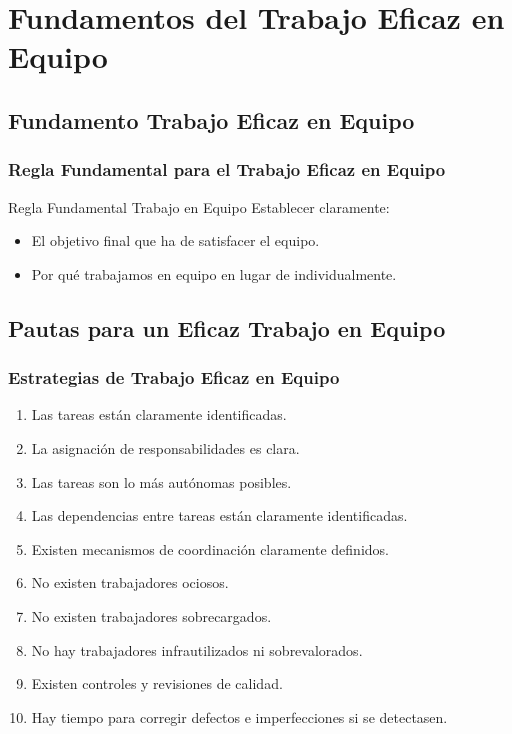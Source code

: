 \documentclass[a4paper,slidestop,xcolor=pst,dvips,blue]{beamer}
\begin{document}
\section{Fundamentos del Trabajo Eficaz en Equipo}

\subsection{Fundamento Trabajo Eficaz en Equipo}

\begin{frame}[c]
	\frametitle{Regla Fundamental para el Trabajo Eficaz en Equipo}
	\begin{block}{Regla Fundamental Trabajo en Equipo}
		Establecer claramente:
		\begin{itemize}
			\item<2-> El objetivo final que ha de satisfacer el equipo.
			\item<3-> Por qué trabajamos en equipo en lugar de individualmente.
		\end{itemize}
	\end{block}
\end{frame}

\subsection{Pautas para un Eficaz Trabajo en Equipo}

\begin{frame}[c]
	\frametitle{Estrategias de Trabajo Eficaz en Equipo}
	\begin{enumerate}[<+->]
		\item Las tareas están claramente identificadas.
		\item La asignación de responsabilidades es clara.
		\item Las tareas son lo más autónomas posibles.
		\item Las dependencias entre tareas están claramente identificadas.
		\item Existen mecanismos de coordinación claramente definidos.
		\item No existen trabajadores ociosos.
		\item No existen trabajadores sobrecargados.
		\item No hay trabajadores infrautilizados ni sobrevalorados.
		\item Existen controles y revisiones de calidad.
		\item Hay tiempo para corregir defectos e imperfecciones si se detectasen.
	\end{enumerate}
\end{frame}
\end{document}
